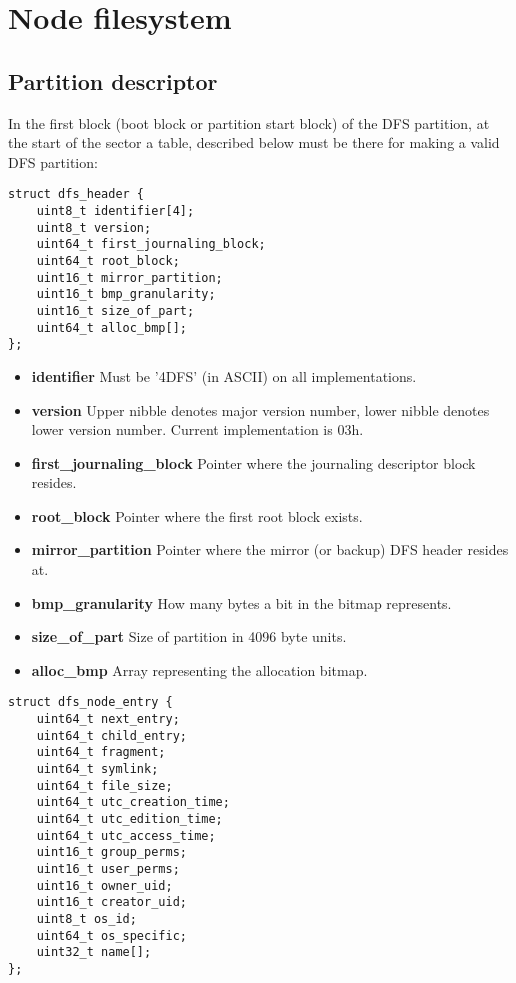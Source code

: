 \documentclass[12pt]{article}
\begin{document}
\section{Node filesystem}

\subsection{Partition descriptor}

In the first block (boot block or partition start block) of the DFS partition, at the start of the sector a table, described below must be there for making a valid DFS partition:

\begin{verbatim}
struct dfs_header {
	uint8_t identifier[4];
	uint8_t version;
	uint64_t first_journaling_block;
	uint64_t root_block;
	uint16_t mirror_partition;
	uint16_t bmp_granularity;
	uint16_t size_of_part;
	uint64_t alloc_bmp[];
};
\end{verbatim}

\begin{itemize}
	\item \textbf{identifier} Must be '4DFS' (in ASCII) on all implementations.
	\item \textbf{version} Upper nibble denotes major version number, lower nibble denotes lower version number. Current implementation is 03h.
	\item \textbf{first\_journaling\_block} Pointer where the journaling descriptor block resides.
	\item \textbf{root\_block} Pointer where the first root block exists.
	\item \textbf{mirror\_partition} Pointer where the mirror (or backup) DFS header resides at.
	\item \textbf{bmp\_granularity} How many bytes a bit in the bitmap represents.
	\item \textbf{size\_of\_part} Size of partition in 4096 byte units.
	\item \textbf{alloc\_bmp} Array representing the allocation bitmap.
\end{itemize}

\begin{verbatim}
struct dfs_node_entry {
	uint64_t next_entry;
	uint64_t child_entry;
	uint64_t fragment;
	uint64_t symlink;
	uint64_t file_size;
	uint64_t utc_creation_time;
	uint64_t utc_edition_time;
	uint64_t utc_access_time;
	uint16_t group_perms;
	uint16_t user_perms;
	uint16_t owner_uid;
	uint16_t creator_uid;
	uint8_t os_id;
	uint64_t os_specific;
	uint32_t name[];
};
\end{verbatim}
\end{document}
